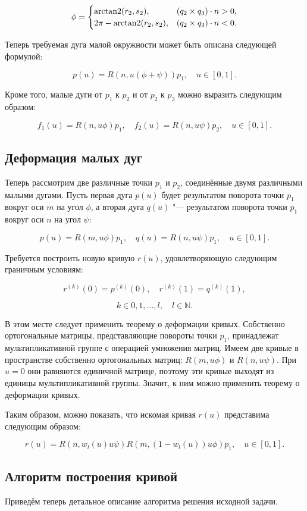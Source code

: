 \begin{equation*}
\phi=
 \begin{cases}
   \operatorname{arctan2}(r_2,s_2),      & (q_2\times q_3)\cdot n>0, \\
   2\pi-\operatorname{arctan2}(r_2,s_2), & (q_2\times q_3)\cdot n<0.
 \end{cases}
\end{equation*}

Теперь требуемая дуга малой окружности может быть описана следующей формулой:

$$
p(u)=R(n,u(\phi+\psi))p_1, \quad u \in [0,1].
$$

Кроме того, малые дуги от $p_1$ к $p_2$ и от $p_2$ к $p_3$ можно выразить следующим образом:

$$
f_1(u)=R(n,u\phi)p_1, \quad f_2(u)=R(n,u\psi)p_2, \quad u \in [0,1].
$$

\subsection*{Деформация малых дуг}

Теперь рассмотрим две различные точки $p_1$ и $p_2$, соединённые двумя различными малыми дугами. Пусть первая дуга
$p(u)$ будет результатом поворота точки $p_1$ вокруг оси $m$ на угол $\phi$, а вторая дуга $q(u)$ "--- результатом
поворота точки $p_1$ вокруг оси $n$ на угол $\psi$:

$$
p(u)=R(m,u\phi)p_1, \quad q(u)=R(n,u\psi)p_1, \quad u \in [0,1].
$$

Требуется построить новую кривую $r(u)$, удовлетворяющую следующим граничным условиям:

$$
r^{(k)}(0)=p^{(k)}(0), \quad r^{(k)}(1)=q^{(k)}(1),
$$

$$
k \in {0,1,\dots,l}, \quad l \in \mathbb{N}.
$$

В этом месте следует применить теорему о деформации кривых. Собственно ортогональные матрицы, представляющие повороты
точки $p_1$, принадлежат мультипликативной группе с операцией умножения матриц. Имеем две кривые в пространстве
собственно ортогональных матриц: $R(m,u\phi)$ и $R(n,u\psi)$. При $u=0$ они равняются единичной матрице, поэтому эти
кривые выходят из единицы мультипликативной группы. Значит, к ним можно применить теорему о деформации кривых.

Таким образом, можно показать, что искомая кривая $r(u)$ представима следующим образом:

$$
r(u)=R(n,w_l(u)u\psi)R(m,(1-w_l(u))u\phi)p_1, \quad u \in [0,1].
$$

\subsection*{Алгоритм построения кривой}

Приведём теперь детальное описание алгоритма решения исходной задачи.
